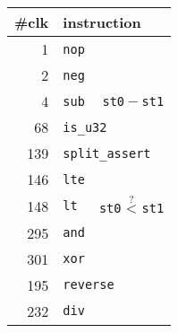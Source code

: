 \documentclass{article}
\newcommand{\hintsub}{
\textcolor{hint}{\texttt{st0}${}-{}$\texttt{st1}}
}
\newcommand{\hintlt}{
\textcolor{hint}{\texttt{st0} $\stackrel{\texttt{?}}{\texttt{<}}$ \texttt{st1}}
}
\newcommand{\hintdiv}{
    \textcolor{hint}{\nicefrac{\texttt{st0}}{\texttt{st1}}}
}
\begin{document}
\vfill%
\begin{minipage}{0.3\textwidth}
    \begin{tabular}{rlr}
        \toprule
        \#clk & \multicolumn{2}{l}{instruction}            \\ \midrule
            1 & \multicolumn{2}{l}{\texttt{nop}}           \\
            2 & \multicolumn{2}{l}{\texttt{neg}}           \\
            4 & \texttt{sub} &                    \hintsub \\
           68 & \multicolumn{2}{l}{\texttt{is\_u32}}       \\
          139 & \multicolumn{2}{l}{\texttt{split\_assert}} \\
          146 & \multicolumn{2}{l}{\texttt{lte}}           \\
          148 & \texttt{lt}  &                     \hintlt \\
          295 & \multicolumn{2}{l}{\texttt{and}}           \\
          301 & \multicolumn{2}{l}{\texttt{xor}}           \\
          195 & \multicolumn{2}{l}{\texttt{reverse}}       \\
          232 & \texttt{div} &                    \hintdiv \\ \bottomrule
    \end{tabular}
\end{minipage}
\end{document}
